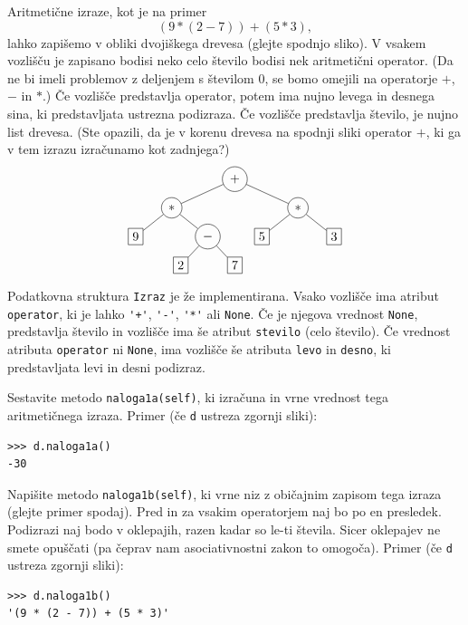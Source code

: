 \documentclass[arhiv]{../izpit}
\begin{document}

Aritmetične izraze, kot je na primer
$$(9 * (2 - 7)) + (5 * 3),$$
lahko zapišemo v obliki dvojiškega drevesa (glejte spodnjo sliko). V vsakem vozlišču je zapisano bodisi neko celo število bodisi nek aritmetični operator. (Da ne bi imeli problemov z deljenjem s številom $0$, se bomo omejili na operatorje $+$, $-$ in $*$.) Če vozlišče predstavlja operator, potem ima nujno levega in desnega sina, ki predstavljata ustrezna podizraza. Če vozlišče predstavlja število, je nujno list drevesa. (Ste opazili, da je v korenu drevesa na spodnji sliki operator $+$, ki ga v tem izrazu izračunamo kot zadnjega?)
$$
\begin{tikzpicture}[level distance=0.8cm,
    level 1/.style={sibling distance=3.5cm},
    level 2/.style={sibling distance=2cm},
    level 3/.style={sibling distance=1.5cm}
    ]
    \node[circle, draw] (d) {$+$}
      child {node[circle, draw] {$*$}
        child {node[rectangle, draw] {$9$}}
        child {node[circle, draw] {$-$}
          child {node[rectangle, draw] {$2$}}
          child {node[rectangle, draw] {$7$}}
        }
      }
      child {node[circle, draw] {$*$}
        child {node[rectangle, draw] {$5$}}
        child {node[rectangle, draw] {$3$}}
      };
  \end{tikzpicture}
$$
Podatkovna struktura \texttt{Izraz} je že implementirana. Vsako vozlišče ima atribut \texttt{operator}, ki je lahko \verb|'+'|, \verb|'-'|, \verb|'*'| ali \verb|None|. Če je njegova vrednost \verb|None|, predstavlja število in vozlišče ima še atribut \verb+stevilo+ (celo število). Če vrednost atributa \texttt{operator} ni \verb|None|, ima vozlišče še atributa \texttt{levo} in \texttt{desno}, ki predstavljata levi in desni podizraz.

\podnaloga[10 točk]
Sestavite metodo \texttt{naloga1a(self)}, ki izračuna in vrne vrednost tega aritmetičnega izraza. Primer (če \texttt{d} ustreza zgornji sliki):
%
\begin{verbatim}
>>> d.naloga1a()
-30
\end{verbatim}

\podnaloga[10 točk]
Napišite metodo \texttt{naloga1b(self)}, ki vrne niz z običajnim zapisom tega izraza (glejte primer spodaj). Pred in za vsakim operatorjem naj bo po en presledek. Podizrazi naj bodo v oklepajih, razen kadar so le-ti števila. Sicer oklepajev ne smete opuščati (pa čeprav nam asociativnostni zakon to omogoča). Primer (če \texttt{d} ustreza zgornji sliki):
%
\begin{verbatim}
>>> d.naloga1b()
'(9 * (2 - 7)) + (5 * 3)'
\end{verbatim}
\end{document}
